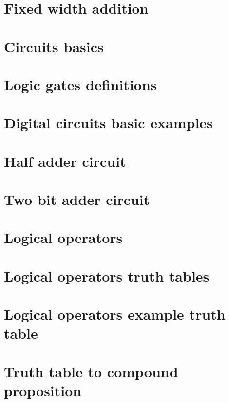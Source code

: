 \section*{Fixed width addition}

\vfill
\section*{Circuits basics}

\vfill
\section*{Logic gates definitions}

\vfill
\section*{Digital circuits basic examples}

\vfill
\section*{Half adder circuit}

\vfill
\section*{Two bit adder circuit}

\vfill
\section*{Logical operators}

\vfill
\section*{Logical operators truth tables}

\vfill
\section*{Logical operators example truth table}

\vfill
\section*{Truth table to compound proposition}

\vfill

